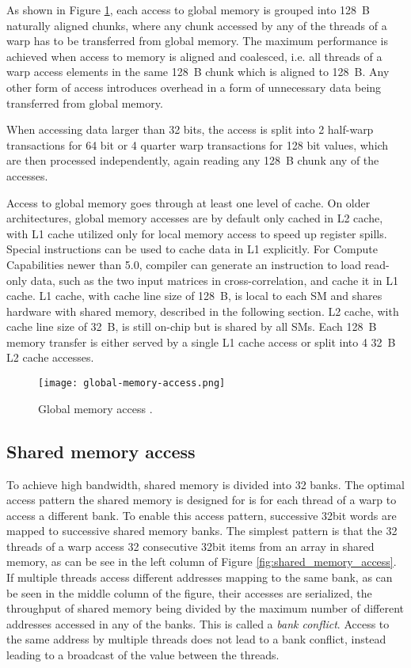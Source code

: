As shown in Figure \ref{fig:global_memory_access}, each access to global memory is grouped into 128~B naturally aligned chunks, where any chunk accessed by any of the threads of a warp has to be transferred from global memory. The maximum performance is achieved when access to memory is aligned and coalesced, i.e. all threads of a warp access elements in the same 128~B chunk which is aligned to 128~B. Any other form of access introduces overhead in a form of unnecessary data being transferred from global memory. 

When accessing data larger than 32 bits, the access is split into 2 half-warp transactions for 64 bit or 4 quarter warp transactions for 128 bit values, which are then processed independently, again reading any 128~B chunk any of the accesses. 

Access to global memory goes through at least one level of cache. On older architectures, global memory accesses are by default only cached in L2 cache, with L1 cache utilized only for local memory access to speed up register spills. %
Special instructions can be used to cache data in L1 explicitly. For Compute Capabilities newer than 5.0, compiler can generate an instruction to load read-only data, such as the two input matrices in cross-correlation, and cache it in L1 cache. L1 cache, with cache line size of 128~B, is local to each SM and shares hardware with shared memory, described in the following section. L2 cache, with cache line size of 32~B, is still on-chip but is shared by all SMs. Each 128~B memory transfer is either served by a single L1 cache access or split into 4 32~B L2 cache accesses.

\begin{figure}[ht]
	\centering
	\texttt{[image: global-memory-access.png]}
	\caption{Global memory access \citep{site:cuda}.}
	\label{fig:global_memory_access}
\end{figure}

\subsection{Shared memory access}
To achieve high bandwidth, shared memory is divided into 32 banks. The optimal access pattern the shared memory is designed for is for each thread of a warp to access a different bank. To enable this access pattern, successive 32bit words are mapped to successive shared memory banks. The simplest pattern is that the 32 threads of a warp access 32 consecutive 32bit items from an array in shared memory, as can be see in the left column of Figure \ref{fig:shared_memory_access}. If multiple threads access different addresses mapping to the same bank, as can be seen in the middle column of the figure, their accesses are serialized, the throughput of shared memory being divided by the maximum number of different addresses accessed in any of the banks. This is called a \textit{bank conflict}. Access to the same address by multiple threads does not lead to a bank conflict, instead leading to a broadcast of the value between the threads.

